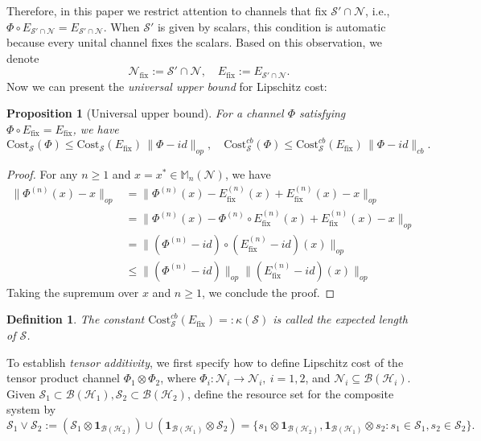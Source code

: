 \documentclass[11pt,reqno]{amsart}
\numberwithin{equation}{section}
\newtheorem{prop}[lemma]{Proposition}
\newtheorem{definition}[lemma]{Definition}
\newcommand{\mb}{\mathbb}
\newcommand{\mc}{\mathcal}
\newcommand{\Cost}{\mathrm{Cost}}
\newcommand{\fix}{\mathrm{fix}}
\begin{document}
Therefore, in this paper we restrict attention to channels that fix $\mc S' \cap \mc N$, i.e., $\Phi \circ E_{\mc S'\cap \mc N} = E_{\mc S'\cap \mc N}$. When $\mc S'$ is given by scalars, this condition is automatic
because every unital channel fixes the scalars. Based on this observation, we denote 
\begin{equation}\label{def: fixed point algebra}
    \mc N_{\fix} :=  \mc S'\cap \mc N,\quad E_{\fix}:= E_{\mc S'\cap \mc N}.
\end{equation}
Now we can present the \textit{universal upper bound} for Lipschitz cost:
\begin{prop}[Universal upper bound] \label{main:universal bound}
    For a channel $\Phi$ satisfying $\Phi \circ E_{\fix} = E_\fix$, we have 
    \begin{equation}
        \Cost_{\mc S}(\Phi) \le  \Cost_{\mc S}(E_{\fix})\, \|\Phi - id\|_{op},\quad \Cost_{\mc S}^{cb}(\Phi) \le  \Cost^{cb}_{\mc S}(E_{\fix})\, \|\Phi - id\|_{cb}.
    \end{equation}
\end{prop}
\begin{proof}
    For any $n\ge 1$ and $x = x^* \in \mb M_n(\mc N)$, we have 
    \begin{align*}
        \|\Phi^{(n)}(x)- x\|_{op}& = \|\Phi^{(n)}(x)- E_{\fix}^{(n)}(x) + E_{\fix}^{(n)}(x) - x\|_{op} \\
        & = \|\Phi^{(n)}(x)- \Phi^{(n)}\circ E_{\fix}^{(n)}(x) + E_{\fix}^{(n)} (x) - x\|_{op} \\
        & = \|(\Phi^{(n)} - id) \circ (E_{\fix}^{(n)} - id)(x)\|_{op} \\
        & \le \|(\Phi^{(n)} - id)\|_{op} \|(E_{\fix}^{(n)} - id)(x)\|_{op}
    \end{align*}
    Taking the supremum over $x$ and $n\ge 1$, we conclude the proof.
\end{proof}
\begin{definition}\label{def: expected length}
      The constant $\Cost^{cb}_{\mc S}(E_{\fix})=: \kappa(\mc S)$ is called the \textit{expected length} of $\mc S$.
\end{definition}
To establish \textit{tensor additivity}, we first specify how to define Lipschitz cost of the tensor product channel $\Phi_1 \otimes \Phi_2$, where $\Phi_i: \mc N_i\to \mc N_i,\ i = 1,2$, and $\mc N_i \subseteq \mc B(\mc H_i)$. Given $\mc S_1 \subset \mc B(\mc H_1), \mc S_2 \subset \mc B(\mc H_2)$, define the resource set for the composite system by
   \begin{equation}
   \mc S_1 \vee \mc S_2:= (\mc S_1 \otimes \textbf{1}_{\mc B(\mc H_2)})\cup (\textbf{1}_{\mc B(\mc H_1)} \otimes \mc S_2) = \{s_1\otimes \textbf{1}_{\mc B(\mc H_2)}, \textbf{1}_{\mc B(\mc H_1)}\otimes s_2: s_1\in \mc S_1, s_2\in \mc S_2\}. 
   \end{equation}
\end{document}
